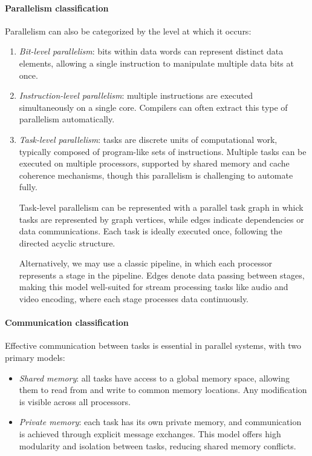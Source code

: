 \paragraph*{Parallelism classification}
Parallelism can also be categorized by the level at which it occurs:
\begin{enumerate}
    \item \textit{Bit-level parallelism}: bits within data words can represent distinct data elements, allowing a single instruction to manipulate multiple data bits at once.
    \item \textit{Instruction-level parallelism}: multiple instructions are executed simultaneously on a single core.
        Compilers can often extract this type of parallelism automatically.
    \item \textit{Task-level parallelism}: tasks are discrete units of computational work, typically composed of program-like sets of instructions.
        Multiple tasks can be executed on multiple processors, supported by shared memory and cache coherence mechanisms, though this parallelism is challenging to automate fully.
        
        Task-level parallelism can be represented with a parallel task graph in whick tasks are represented by graph vertices, while edges indicate dependencies or data communications.
        Each task is ideally executed once, following the directed acyclic structure.

        Alternatively, we may use a classic pipeline, in which each processor represents a stage in the pipeline.
        Edges denote data passing between stages, making this model well-suited for stream processing tasks like audio and video encoding, where each stage processes data continuously.
\end{enumerate}

\paragraph*{Communication classification}
Effective communication between tasks is essential in parallel systems, with two primary models:
\begin{itemize}
    \item \textit{Shared memory}: all tasks have access to a global memory space, allowing them to read from and write to common memory locations. 
        Any modification is visible across all processors.
    \item \textit{Private memory}: each task has its own private memory, and communication is achieved through explicit message exchanges. 
        This model offers high modularity and isolation between tasks, reducing shared memory conflicts.
\end{itemize}